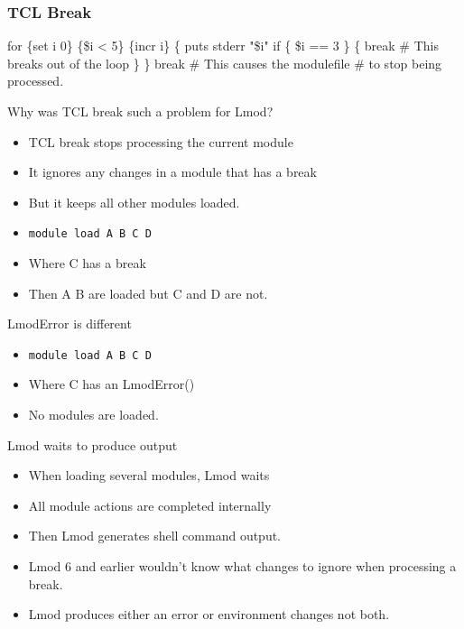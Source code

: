 \documentclass{beamer}
\begin{document}
\begin{frame}[fragile]
    \frametitle{TCL Break}
 {\small
   \begin{semiverbatim}
for \{set i 0\} \{\$i < 5\} \{incr i\} \{
  puts stderr "\$i"
  if \{ \$i == 3 \} \{
      break  # This breaks out of the loop
  \}
\}
break # This causes the modulefile
      # to stop being processed.       
    \end{semiverbatim}
}
\end{frame}

\begin{frame}{Why was TCL break such a problem for Lmod?}
  \begin{itemize}
    \item TCL break stops processing the current module
    \item It ignores any changes in a module that has a break
    \item But it keeps all other modules loaded.
    \item {\color{blue} \texttt{module load A B C D}} 
    \item Where C has a break
    \item Then A B are loaded but C and D are not.
  \end{itemize}
\end{frame}

\begin{frame}{LmodError is different}
  \begin{itemize}
    \item {\color{blue} \texttt{module load A B C D}} 
    \item Where C has an LmodError()
    \item No modules are loaded.
  \end{itemize}
\end{frame}

\begin{frame}{Lmod waits to produce output}
  \begin{itemize}
    \item When loading several modules, Lmod waits
    \item All module actions are completed internally
    \item Then Lmod generates shell command output.
    \item Lmod 6 and earlier wouldn't know what changes to ignore when
      processing a break.
    \item Lmod produces either an error or environment changes
      not both.
  \end{itemize}
\end{frame}
\end{document}
